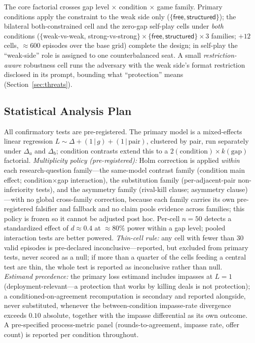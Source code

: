 \documentclass[conference]{IEEEtran}
\begin{document}
The core factorial crosses gap level $\times$ condition $\times$ game family. Primary conditions apply the constraint to the weak side only ($\{\textsf{free}, \textsf{structured}\}$); the bilateral \textsf{both-constrained} cell and the zero-gap self-play cells under \emph{both} conditions ($\{$weak-vs-weak, strong-vs-strong$\} \times \{\textsf{free}, \textsf{structured}\} \times 3$ families; ${+}12$ cells, ${\approx}600$ episodes over the base grid) complete the design; in self-play the ``weak-side'' role is assigned to one counterbalanced seat. A small \emph{restriction-aware} robustness cell runs the adversary with the weak side's format restriction disclosed in its prompt, bounding what ``protection'' means (Section~\ref{sec:threats}).

\subsection{Statistical Analysis Plan}
\label{sec:stats}

All confirmatory tests are pre-registered. The primary model is a mixed-effects linear regression $L \sim \Delta + (1\,|\,g) + (1\,|\,\text{pair})$, clustered by pair, run separately under $\Delta_a$ and $\Delta_b$; condition contrasts extend this to a $2(\text{condition}) \times k(\text{gap})$ factorial. \emph{Multiplicity policy (pre-registered):} Holm correction is applied \emph{within} each research-question family---the same-model contrast family (condition main effect; condition$\times$gap interaction), the substitution family (per-adjacent-pair non-inferiority tests), and the asymmetry family (rival-kill clause; asymmetry clause)---with no global cross-family correction, because each family carries its own pre-registered falsifier and fallback and no claim pools evidence across families; this policy is frozen so it cannot be adjusted post hoc. Per-cell $n{=}50$ detects a standardized effect of $d \approx 0.4$ at ${\approx}80\%$ power within a gap level; pooled interaction tests are better powered. \emph{Thin-cell rule:} any cell with fewer than 30 valid episodes is pre-declared inconclusive---reported, but excluded from primary tests, never scored as a null; if more than a quarter of the cells feeding a central test are thin, the whole test is reported as inconclusive rather than null. \emph{Estimand precedence:} the primary loss estimand includes impasses at $L{=}1$ (deployment-relevant---a protection that works by killing deals is not protection); a conditioned-on-agreement recomputation is secondary and reported alongside, never substituted, whenever the between-condition impasse-rate divergence exceeds $0.10$ absolute, together with the impasse differential as its own outcome. A pre-specified process-metric panel (rounds-to-agreement, impasse rate, offer count) is reported per condition throughout.
\end{document}
